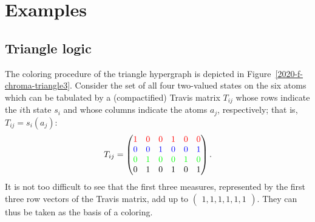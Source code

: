 \documentclass[%
12pt,
prereprint,
showpacs,
showkeys,
preprintnumbers,
amsmath,amssymb,
aps,
pra,
longbibliography,
notitlepage
]{revtex4-1}
\theoremstyle{definition}
\begin{document}
        \appendix


        \section{Examples}
        \subsection{Triangle logic}

        The coloring procedure of the triangle hypergraph is depicted in Figure~\ref{2020-f-chroma-triangle3}.
        Consider the set of all four two-valued states on the six atoms which can be tabulated by a
        (compactified) Travis matrix $T_{ij}$
        whose rows indicate the
        $i$th state $s_i$ and whose columns
        indicate the atoms $a_j$, respectively; that is, $T_{ij}=s_i(a_j)$:
        \begin{equation}
                T_{ij}=\begin{pmatrix}
                        {\color{red}1}&{\color{red}0}&{\color{red}0}&{\color{red}1}&{\color{red}0}&{\color{red}0}\\
                        {\color{blue}0}&{\color{blue}0}&{\color{blue}1}&{\color{blue}0}&{\color{blue}0}&{\color{blue}1}\\
                        {\color{green}0}&{\color{green}1}&{\color{green}0}&{\color{green}0}&{\color{green}1}&{\color{green}0}\\
                        0&1&0&1&0&1
                \end{pmatrix}
                .
        \end{equation}
        It is not too difficult to see that the first three measures, represented by the first three row vectors of the
        Travis matrix, add up to
        $
        \begin{pmatrix}
                1,1,1,1,1,1
        \end{pmatrix}
        $. They can thus be taken as the basis of a coloring.
\end{document}
